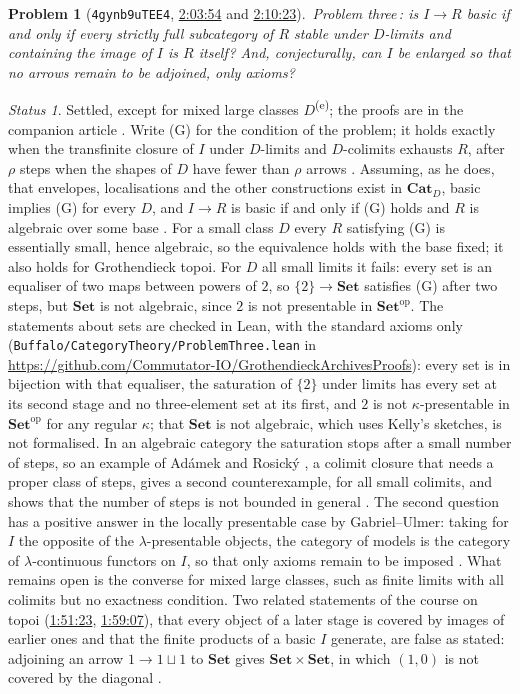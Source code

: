\documentclass[11pt,a4paper]{amsart}
\newtheorem{problem}{Problem}
\theoremstyle{definition}
\theoremstyle{remark}
\newtheorem*{status}{Status}
\newcommand{\q}[1]{\guillemotleft\,#1\,\guillemotright}
\newcommand{\ts}[3]{\href{https://www.youtube.com/watch?v=#1&t=#2}{#3}}
\newcommand{\Set}{\mathbf{Set}}
\newcommand{\Cat}{\mathbf{Cat}}
\newcommand{\own}{\textsuperscript{(e)}}
\begin{document}
\begin{problem}[\texttt{4gynb9uTEE4}, \ts{4gynb9uTEE4}{2h3m54s}{2:03:54} and \ts{4gynb9uTEE4}{2h10m23s}{2:10:23}]\label{p:three}
\q{Problem three}: is $I\to R$ basic if and only if every strictly full subcategory of $R$ stable under $D$-limits and containing the image of $I$ is $R$ itself? And, conjecturally, can $I$ be enlarged so that no arrows remain to be adjoined, only axioms?
\end{problem}
\begin{status}
Settled, except for mixed large classes $D$\own; the proofs are in the companion article \cite{three}. Write (G) for the condition of the problem; it holds exactly when the transfinite closure of $I$ under $D$-limits and $D$-colimits exhausts $R$, after $\rho$ steps when the shapes of $D$ have fewer than $\rho$ arrows \cite[\S3.5]{kellybook}. Assuming, as he does, that envelopes, localisations and the other constructions exist in $\Cat_D$, basic implies (G) for every $D$, and $I\to R$ is basic if and only if (G) holds and $R$ is algebraic over some base \cite{three}. For a small class $D$ every $R$ satisfying (G) is essentially small, hence algebraic, so the equivalence holds with the base fixed; it also holds for Grothendieck topoi. For $D$ all small limits it fails: every set is an equaliser of two maps between powers of $2$, so $\{2\}\to\Set$ satisfies (G) after two steps, but $\Set$ is not algebraic, since $2$ is not presentable in $\Set^{\mathrm{op}}$. The statements about sets are checked in Lean, with the standard axioms only (\texttt{Buffalo/\allowbreak CategoryTheory/\allowbreak ProblemThree.lean} in \url{https://github.com/Commutator-IO/GrothendieckArchivesProofs}): every set is in bijection with that equaliser, the saturation of $\{2\}$ under limits has every set at its second stage and no three-element set at its first, and $2$ is not $\kappa$-presentable in $\Set^{\mathrm{op}}$ for any regular $\kappa$; that $\Set$ is not algebraic, which uses Kelly's sketches, is not formalised. In an algebraic category the saturation stops after a small number of steps, so an example of Adámek and Rosický \cite[Example~6.38]{ar}, a colimit closure that needs a proper class of steps, gives a second counterexample, for all small colimits, and shows that the number of steps is not bounded in general \cite{three}. The second question has a positive answer in the locally presentable case by Gabriel--Ulmer: taking for $I$ the opposite of the $\lambda$-presentable objects, the category of models is the category of $\lambda$-continuous functors on $I$, so that only axioms remain to be imposed \cite{gu}. What remains open is the converse for mixed large classes, such as finite limits with all colimits but no exactness condition. Two related statements of the course on topoi (\ts{ORG14LNb5gE}{1h51m23s}{1:51:23}, \ts{ORG14LNb5gE}{1h59m7s}{1:59:07}), that every object of a later stage is covered by images of earlier ones and that the finite products of a basic $I$ generate, are false as stated: adjoining an arrow $1\to1\sqcup1$ to $\Set$ gives $\Set\times\Set$, in which $(1,0)$ is not covered by the diagonal \cite{three}.
\end{status}
\end{document}
